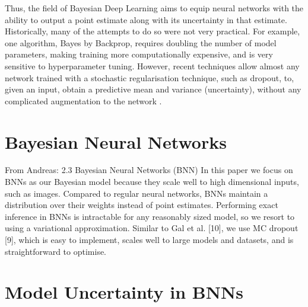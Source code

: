 \documentclass[11pt, a4paper, bibliography=totoc]{report}
\begin{document}
Thus, the field of Bayesian Deep Learning aims to equip neural networks with the ability to output a point estimate along with its uncertainty in that estimate. Historically, many of the attempts to do so were not very practical. For example, one algorithm, Bayes by Backprop, requires doubling the number of model parameters, making training more computationally expensive, and is very sensitive to hyperparameter tuning. However, recent techniques allow almost any network trained with a stochastic regularisation technique, such as dropout, to, given an input, obtain a predictive mean and variance (uncertainty), without any complicated augmentation to the network \cite[p.~15]{Gal2017a}.

\section{Bayesian Neural Networks} \label{sec:bnns}
From Andreas:
2.3 Bayesian Neural Networks (BNN)
In this paper we focus on BNNs as our Bayesian model because they scale well to high dimensional
inputs, such as images. Compared to regular neural networks, BNNs maintain a distribution over
their weights instead of point estimates. Performing exact inference in BNNs is intractable for any
reasonably sized model, so we resort to using a variational approximation. Similar to Gal et al. [10],
we use MC dropout [9], which is easy to implement, scales well to large models and datasets, and is
straightforward to optimise.

\section{Model Uncertainty in BNNs}
\end{document}
